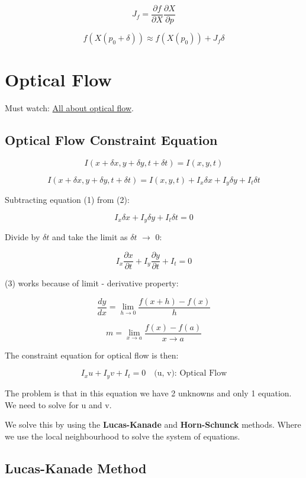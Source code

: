 \documentclass{article}
\begin{document}
\begin{multicols}{2}
	\[
		J_f = \frac{\partial f}{\partial X} \frac{\partial X}{\partial p}
	\]

	\[
		f(X(p_0 + \delta)) \approx f(X(p_0)) + J_f \delta
	\]


	\section{Optical Flow}

	Must watch: \href{https://www.youtube.com/watch?v=lnXFcmLB7sM&list=PL2zRqk16wsdoYzrWStffqBAoUY8XdvatV}{All about optical flow}.

	\subsection{Optical Flow Constraint Equation}

	\[
		I(x + \delta x, y + \delta y, t + \delta t) = I(x, y, t) \tag{1}
	\]

	\[
		I(x + \delta x, y + \delta y, t + \delta t) = I(x, y, t) + I_{x} \delta x + I_{y} \delta y + I_{t} \delta t \tag{2}
	\]

	Subtracting equation (1) from (2):

	\[
		I_{x} \delta x + I_{y} \delta y + I_{t} \delta t = 0
	\]

	Divide by $\delta t$  and take the limit as $\delta t$ $\to$ 0:

	\[
		I_{x} \frac{\partial x}{\partial t} + I_{y} \frac{\partial y}{\partial t} + I_{t} = 0 \tag{3}
	\]

	(3) works because of limit - derivative property:

	\[
		\frac{dy}{dx} = \lim_{h \to 0} \frac{f(x + h) - f(x)}{h}
	\]

	\[
		m = \lim_{x \to a} \frac{f(x) - f(a)}{x \to a}
	\]



	The constraint equation for optical flow is then:

	\[
		I_{x} u + I_{y} v + I_{t} = 0 \quad \text{(u, v): Optical Flow}
	\]

	The problem is that in this equation we have 2 unknowns and only 1 equation. We need to solve for u and v.

	We solve this by using the \textbf{Lucas-Kanade} and \textbf{Horn-Schunck} methods. Where we use the local neighbourhood to solve the system of equations.


	\subsection{Lucas-Kanade Method}


\end{multicols}
\end{document}
